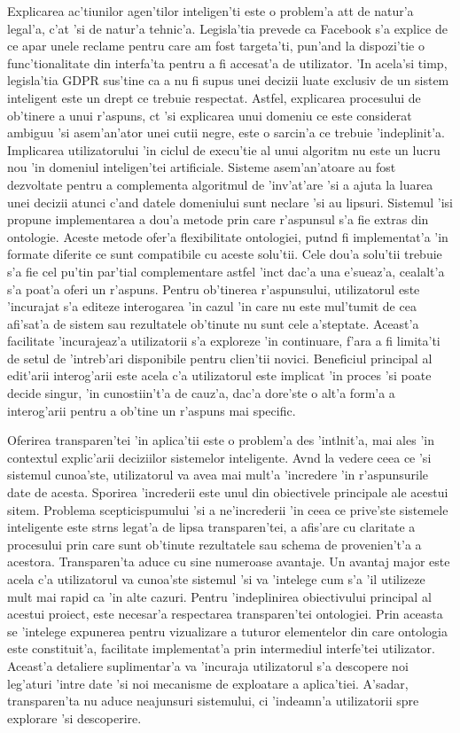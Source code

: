 \documentclass[12pt,a4paper,twoside]{report}
\begin{document}
Explicarea ac'tiunilor agen'tilor inteligen'ti este o problem'a at\ia t de natur'a legal'a, c'at 'si de natur'a tehnic'a. Legisla'tia prevede ca Facebook s'a explice de ce apar unele reclame pentru care am fost targeta'ti, pun'and la dispozi'tie o func'tionalitate din interfa'ta pentru a fi accesat'a de utilizator. 'In acela'si timp, legisla'tia GDPR sus'tine ca a nu fi supus unei decizii luate exclusiv de un sistem inteligent este un drept ce trebuie respectat. Astfel, explicarea procesului de ob'tinere a unui r'aspuns, c\ia t 'si explicarea unui domeniu ce este considerat ambiguu 'si asem'an'ator unei cutii negre, este o sarcin'a ce trebuie 'indeplinit'a.
Implicarea utilizatorului 'in ciclul de execu'tie al unui algoritm nu este un lucru nou 'in domeniul inteligen'tei artificiale. Sisteme asem'an'atoare au fost dezvoltate pentru a complementa algoritmul de 'inv'at'are 'si a ajuta la luarea unei decizii atunci c'and datele domeniului sunt neclare 'si au lipsuri. Sistemul 'isi propune implementarea a dou'a metode prin care r'aspunsul s'a fie extras din ontologie. Aceste metode ofer'a flexibilitate ontologiei, put\ia nd fi implementat'a 'in formate diferite ce sunt compatibile cu aceste solu'tii. Cele dou'a solu'tii trebuie s'a fie cel pu'tin par'tial complementare astfel 'inc\ia t dac'a una e'sueaz'a, cealalt'a s'a poat'a oferi un r'aspuns. Pentru ob'tinerea r'aspunsului, utilizatorul este 'incurajat s'a editeze interogarea 'in cazul 'in care nu este mul'tumit de cea afi'sat'a de sistem sau rezultatele ob'tinute nu sunt cele a'steptate. Aceast'a facilitate 'incurajeaz'a utilizatorii s'a exploreze 'in continuare, f'ara a fi limita'ti de setul de 'intreb'ari disponibile pentru clien'tii novici. Beneficiul principal al edit'arii interog'arii este acela c'a utilizatorul este implicat 'in proces 'si poate decide singur, 'in cunostiin't'a de cauz'a, dac'a dore'ste o alt'a form'a a interog'arii pentru a ob'tine un r'aspuns mai specific. 

Oferirea transparen'tei 'in aplica'tii este o problem'a des 'int\ia lnit'a, mai ales 'in contextul explic'arii deciziilor sistemelor inteligente. Av\ia nd la vedere ceea ce 'si sistemul cunoa'ste, utilizatorul va avea mai mult'a 'incredere 'in r'aspunsurile date de acesta. Sporirea 'increderii este unul din obiectivele principale ale acestui sitem. Problema scepticispumului 'si a ne'increderii 'in ceea ce prive'ste sistemele inteligente este str\ia ns legat'a de lipsa transparen'tei, a afis'are cu claritate a procesului prin care sunt ob'tinute rezultatele sau schema de provenien't'a a acestora. Transparen'ta aduce cu sine numeroase avantaje. Un avantaj major este acela c'a utilizatorul va cunoa'ste sistemul 'si va 'intelege cum s'a 'il utilizeze mult mai rapid ca 'in alte cazuri. Pentru 'indeplinirea obiectivului principal al acestui proiect, este necesar'a respectarea transparen'tei ontologiei. Prin aceasta se 'intelege expunerea pentru vizualizare a tuturor elementelor din care ontologia este constituit'a, facilitate implementat'a prin intermediul interfe'tei utilizator. Aceast'a detaliere suplimentar'a va 'incuraja utilizatorul s'a descopere noi leg'aturi 'intre date 'si noi mecanisme de exploatare a aplica'tiei. A'sadar, transparen'ta nu aduce neajunsuri sistemului, ci 'indeamn'a utilizatorii spre explorare 'si descoperire.
\end{document}
